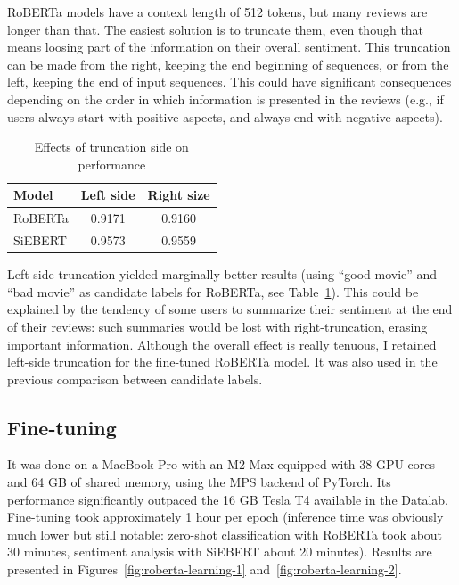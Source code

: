 \documentclass{article}
\begin{document}
RoBERTa models have a context length of 512 tokens, but many reviews are longer than that. The easiest solution is to truncate them, even though that means loosing part of the information on their overall sentiment. This truncation can be made from the right, keeping the end beginning of sequences, or from the left, keeping the end of input sequences. This could have significant consequences depending on the order in which information is presented in the reviews (e.g., if users always start with positive aspects, and always end with negative aspects).

\begin{table}
  \caption{Effects of truncation side on performance}
  \label{tab:truncation}
  \centering
  \begin{tabular}{lcc}
    \toprule
    \textbf{Model} & \textbf{Left side} & \textbf{Right size} \\
    \midrule
    RoBERTa & 0.9171 & 0.9160 \\
    SiEBERT & 0.9573 & 0.9559 \\
    \bottomrule
  \end{tabular}
\end{table}

Left-side truncation yielded marginally better results (using \enquote{good movie} and \enquote{bad movie} as candidate labels for RoBERTa, see Table~\ref{tab:truncation}). This could be explained by the tendency of some users to summarize their sentiment at the end of their reviews: such summaries would be lost with right-truncation, erasing important information. Although the overall effect is really tenuous, I retained left-side truncation for the fine-tuned RoBERTa model. It was also used in the previous comparison between candidate labels.

\subsection{Fine-tuning}

It was done on a MacBook Pro with an M2 Max equipped with 38 GPU cores and 64 GB of shared memory, using the MPS backend of PyTorch. Its performance significantly outpaced the 16 GB Tesla T4 available in the Datalab. Fine-tuning took approximately 1 hour per epoch (inference time was obviously much lower but still notable: zero-shot classification with RoBERTa took about 30 minutes, sentiment analysis with SiEBERT about 20 minutes). Results are presented in Figures~\ref{fig:roberta-learning-1} and~\ref{fig:roberta-learning-2}.
\end{document}
